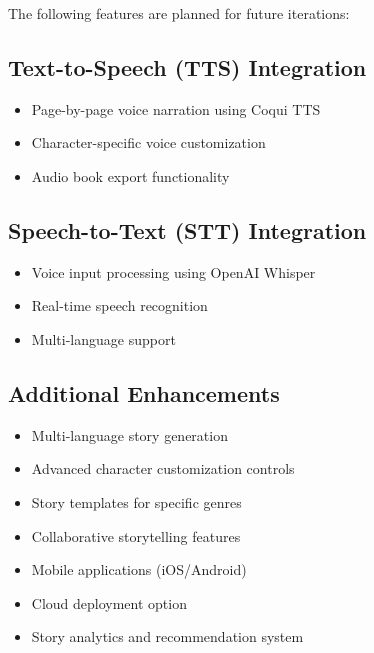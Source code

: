 The following features are planned for future iterations:

\subsection{Text-to-Speech (TTS) Integration}
\begin{itemize}
    \item Page-by-page voice narration using Coqui TTS
    \item Character-specific voice customization
    \item Audio book export functionality
\end{itemize}

\subsection{Speech-to-Text (STT) Integration}
\begin{itemize}
    \item Voice input processing using OpenAI Whisper
    \item Real-time speech recognition
    \item Multi-language support
\end{itemize}

\subsection{Additional Enhancements}
\begin{itemize}
    \item Multi-language story generation
    \item Advanced character customization controls
    \item Story templates for specific genres
    \item Collaborative storytelling features
    \item Mobile applications (iOS/Android)
    \item Cloud deployment option
    \item Story analytics and recommendation system
\end{itemize}
